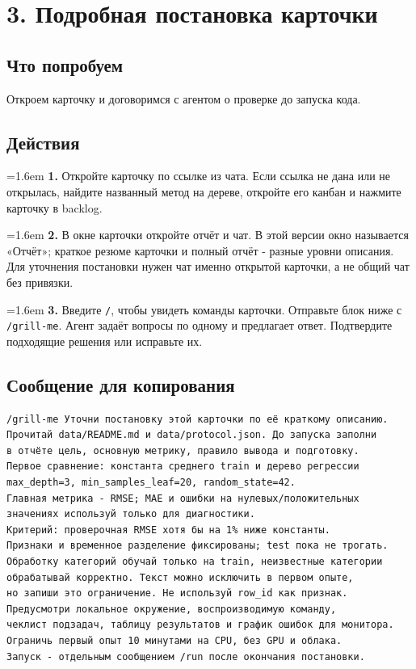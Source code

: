 \documentclass[10pt,a4paper]{article}
\begin{document}
\clearpage
\section{3. Подробная постановка карточки}
\subsection*{Что попробуем}
Откроем карточку и договоримся с агентом о проверке до запуска кода.

\subsection*{Действия}
\par\noindent\hangindent=1.6em \textbf{1.} Откройте карточку по ссылке из чата. Если ссылка не дана или не открылась, найдите названный метод на дереве, откройте его канбан и нажмите карточку в backlog.\par
\par\noindent\hangindent=1.6em \textbf{2.} В окне карточки откройте отчёт и чат. В этой версии окно называется «Отчёт»; краткое резюме карточки и полный отчёт - разные уровни описания. Для уточнения постановки нужен чат именно открытой карточки, а не общий чат без привязки.\par
\par\noindent\hangindent=1.6em \textbf{3.} Введите \texttt{/}, чтобы увидеть команды карточки. Отправьте блок ниже с \texttt{/grill-\allowbreak{}me}. Агент задаёт вопросы по одному и предлагает ответ. Подтвердите подходящие решения или исправьте их.\par
\subsection*{Сообщение для копирования}
\begin{promptbox}
\begin{Verbatim}
/grill-me Уточни постановку этой карточки по её краткому описанию.
Прочитай data/README.md и data/protocol.json. До запуска заполни
в отчёте цель, основную метрику, правило вывода и подготовку.
Первое сравнение: константа среднего train и дерево регрессии
max_depth=3, min_samples_leaf=20, random_state=42.
Главная метрика - RMSE; MAE и ошибки на нулевых/положительных
значениях используй только для диагностики.
Критерий: проверочная RMSE хотя бы на 1% ниже константы.
Признаки и временное разделение фиксированы; test пока не трогать.
Обработку категорий обучай только на train, неизвестные категории
обрабатывай корректно. Текст можно исключить в первом опыте,
но запиши это ограничение. Не используй row_id как признак.
Предусмотри локальное окружение, воспроизводимую команду,
чеклист подзадач, таблицу результатов и график ошибок для монитора.
Ограничь первый опыт 10 минутами на CPU, без GPU и облака.
Запуск - отдельным сообщением /run после окончания постановки.
\end{Verbatim}
\end{promptbox}
\end{document}
